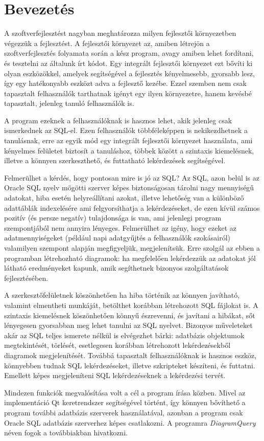 \chapter{Bevezetés}

A szoftverfejlesztést nagyban meghatározza milyen fejlesztői környezetben végezzük a fejlesztést. A fejlesztői
környezet az, amiben létrejön a szoftverfejlesztés folyamata során a kész program, avagy amiben
lehet fordítani, és tesztelni az általunk írt kódot. Egy integrált fejlesztői környezet ezt bővíti
ki olyan eszközökkel, amelyek segítségével a fejlesztés kényelmesebb, gyorsabb lesz, így egy
hatékonyabb eszközt adva a fejlesztő kezébe. Ezzel szemben nem csak tapasztalt felhasználók tarthatnak igényt
egy ilyen környezetre, hanem kevésbé tapasztalt, jelenleg tanuló felhasználók is.

A program ezeknek a felhasználóknak is hasznos lehet, akik jelenleg csak ismerkednek az SQL-el. 
Ezen felhasználók többféleképpen is nekikezdhetnek a tanulásnak, erre az
egyik mód egy integrált fejlesztői környezet használata, ami kényelmes
felületet biztosít a tanuláshoz, többek között a szintaxis kiemelésnek,
illetve a könnyen szerkeszthető, és futtatható lekérdezések segítségével.

Felmerülhet a kérdés, hogy pontosan mire is jó az SQL?
Az SQL, azon belül is az Oracle SQL nyelv mögötti szerver képes biztonságosan tárolni nagy
mennyiségű adatokat, hiba esetén helyreállítani azokat, illetve lehetőség van a különböző adattáblák indexelésére
ami felgyorsíthatja a lekérdezéseket, de ezen kívül számos pozitív (és persze negatív) tulajdonsága is van,
ami jelenlegi program szempontjából nem annyira lényeges. Felmerülhet az igény, hogy ezeket az adatmennyiségeket
(például napi adatgyűjtés a felhasználók szokásairól) valamilyen szempont alapján megfigyeljük, megjelenítsük.
Erre szolgál az ebben a programban létrehozható diagramok: ha megfelelően lekérdezzük az adatokat jól látható
eredményeket kapunk, amik segíthetnek bizonyos szolgáltatások fejlesztésében.

A szerkesztőfelületnek köszönhetően ha hiba történik az könnyen
javítható, valamint elmentheti munkáját, betölthet korábban létrehozott
SQL fájlokat is. A szintaxis kiemelésnek köszönhetően könnyű észrevenni,
és javítani a hibákat, sőt lényegesen gyorsabban meg lehet tanulni az SQL
nyelvet. Bizonyos műveleteket akár az SQL teljes ismerete nélkül is elvégezhet bárki:
adatbázis objektumok megtekintését, törlését, esetlegesen korábban létrehozott lekérdezésekből
diagramok megjelenítését.
Továbbá tapasztalt felhasználóknak is hasznos eszköz, könnyebben tudnak SQL
lekérdezéseket, illetve szkripteket készíteni, és futtatni. Emellett képes megjeleníteni
SQL lekérdezéseknek a lekérdezési tervét.

Mindezen funkciók megvalósítása volt a cél a program írása közben. Mivel az
implementáció Qt keretrendszer segítségével történt, így könnyen bővíthető a program további adatbázis szerverek
használatával, azonban a program csak Oracle SQL adatbázis szerverhez képes csatlakozni.
A programra \textit{DiagramQuery} néven fogok a továbbiakban hivatkozni.